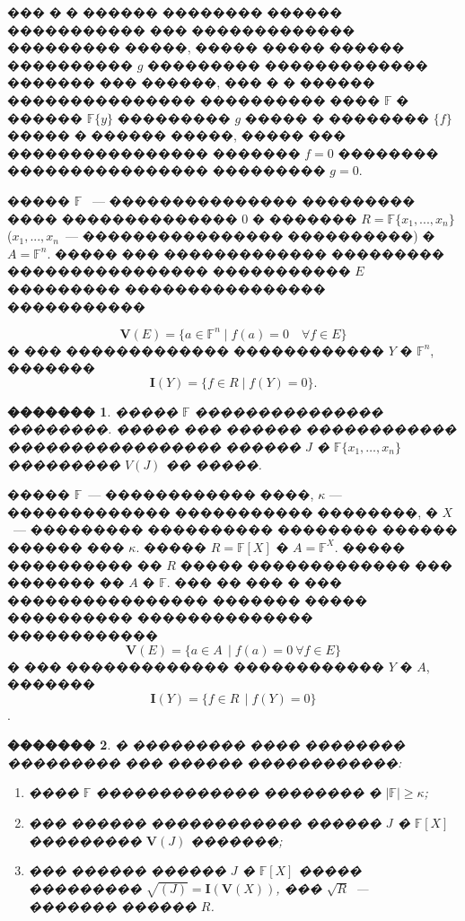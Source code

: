 \documentclass[16pt]{article}
\theoremstyle{plain}
\newtheorem{theorem}{�������}
\theoremstyle{definition}
\theoremstyle{remark}
\begin{document}
��� � � ������ �������� ������ ����������� ��� �������������
��������� �����, ����� ����� ������ ���������� $g$ ���������
������������� ������� ��� ������, ��� � � ������ ���������������
���������� ���� $\mathbb{F}$ � ������  $\mathbb{F}\{y\}$ ��������� $g$ ����� �
�������� $\{f\}$ ����� � ������ �����, ����� ���  ����������������
������� $f=0$ �������� ���������������� ��������� $g=0$.

����� $\mathbb{F}$ ~--- ��������������� ��������� ���� �������������� 0 �
������� $R=\mathbb{F}\{x_1,...,x_n\}$ ($x_1,...,x_n$~--- ����������������
����������) � $A=\mathbb{F}^n$. ����� ��� ������������� ���������
���������������� ����������� $E$ ��������� ���������������� �����������

$$
\mathbf{V}(E)=\{a\in \mathbb{F}^n \mid f(a)=0\quad\forall  f\in E\}
$$
� ��� ������������� ������������ $Y$ � $\mathbb{F}^n$, �������
$$
\mathbf{I}(Y)=\{f \in R \mid f(Y)=0\}.
$$


\begin{theorem}\label{theorem:th 0 for dif}
����� $\mathbb{F}$ ��������������� ��������. ����� ��� ������ ������������ ����������������� ������ $J$ �
$\mathbb{F}\{x_1,\ldots,x_n\}$  ��������� $V(J)$ �� �����.\cite[Chapter~IV,
Section~2, Theorem~1]{Kolchin 2}
\end{theorem}

����� $\mathbb{F}$~--- ������������ ����, $\kappa$ --- �������������
����������� ��������, � $X$~--- ��������� ���������� �������� ������
������ ��� $\kappa$. ����� $R=\mathbb{F}[X]$ � $A=\mathbb{F}^X$. ����� ���������� ��
$R$ ����� ������������� ��� ������� �� $A$ � $\mathbb{F}$. ��� �� ��� � ���
���������������� ������� ����� ���������� �������������� ������������ $$\mathbf{V}(E)=\{a\in A\,
\mid f(a)=0~\forall f\in E\}$$  � ��� ������������� ������������ $Y$
� $A$, �������
$$\mathbf{I}(Y)=\{f \in R\, \mid f(Y)=0\}$$.

\begin{theorem}\label{theorem:th 0 for alg}
� ��������� ���� �������� ��������� ��� ������ ������������:


\begin{enumerate}
\item ���� $\mathbb{F}$ ������������� �������� � $|\mathbb{F}|\geqslant\kappa$;

\item ��� ������ ������������ ������ $J$ � $\mathbb{F}[X]$ ���������
$\mathbf{V}(J)$ �������;

\item ��� ������ ������ $J$ � $\mathbb{F}[X]$ ����� ���������
$\sqrt{(J)}=\mathbf{I}(\mathbf{V}(X))$, ��� $\sqrt{R}$~--- �������
������ $R$.
\end{enumerate}

\end{theorem}
\end{document}
